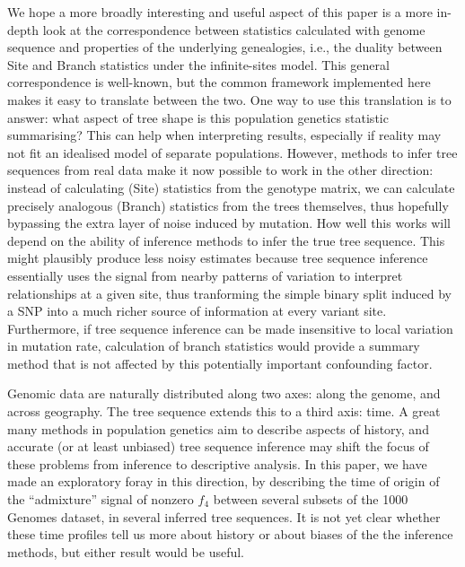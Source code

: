 \documentclass{article}
\begin{document}
We hope a more broadly interesting and useful aspect of this paper
is a more in-depth look at the correspondence between statistics calculated with genome sequence
and properties of the underlying genealogies, i.e.,
the duality between Site and Branch statistics under the infinite-sites model.
This general correspondence is well-known,
but the common framework implemented here makes it easy to translate between the two.
One way to use this translation is to answer:
what aspect of tree shape is this population genetics statistic summarising?
This can help when interpreting results, especially if reality may not fit an idealised model
of separate populations.
However, methods to infer tree sequences from real data
make it now possible to work in the other direction:
instead of calculating (Site) statistics from the genotype matrix,
we can calculate precisely analogous (Branch) statistics from the trees themselves,
thus hopefully bypassing the extra layer of noise induced by mutation.
How well this works will depend on the ability of inference methods
to infer the true tree sequence.
This might plausibly produce less noisy estimates because tree sequence inference
essentially uses the signal from nearby patterns of variation
to interpret relationships at a given site,
thus tranforming the simple binary split induced by a SNP
into a much richer source of information at every variant site.
Furthermore,
if tree sequence inference can be made insensitive to local variation in mutation rate,
calculation of branch statistics would provide a summary method
that is not affected by this potentially important confounding factor.

Genomic data are naturally distributed along two axes: along the genome, and across geography.
The tree sequence extends this to a third axis: time.
A great many methods in population genetics aim to describe aspects of history,
and accurate (or at least unbiased) tree sequence inference
may shift the focus of these problems from inference to descriptive analysis.
In this paper, we have made an exploratory foray in this direction,
by describing the time of origin of the ``admixture'' signal of nonzero $f_4$
between several subsets of the 1000 Genomes dataset,
in several inferred tree sequences.
It is not yet clear whether these time profiles tell us more about history
or about biases of the the inference methods,
but either result would be useful.
\end{document}
